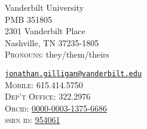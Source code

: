 \noindent
\parbox[t]{0.45\textwidth}{%
Vanderbilt University\\
PMB 351805\\
2301 Vanderbilt Place\\
Nashville, TN 37235-1805\\
\textsc{Pronouns:} they/them/theirs
}
\parbox[t]{0.5\textwidth}{\raggedleft
	{%
    \href{mailto:jonathan.gilligan@vanderbilt.edu}{\nolinkurl{jonathan.gilligan@vanderbilt.edu}}%
	}\\
    \textsc{Mobile:} 615.414.5750\\
    \textsc{Dep't Office:} 322.2976\\
    \textsc{Orcid:} \href{https://orcid.org/0000-0003-1375-6686}{0000-0003-1375-6686}\\
    \textsc{ssrn id:} \href{https://papers.ssrn.com/sol3/cf_dev/AbsByAuth.cfm?per_id=954061}{954061}\\
    \qquad{}
}
